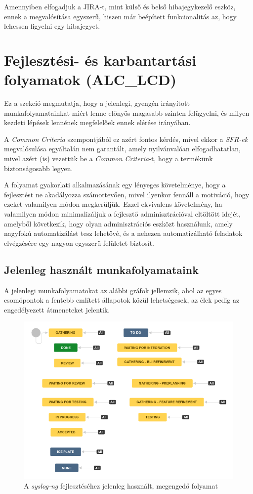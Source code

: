 Amennyiben elfogadjuk a JIRA-t, mint külső és belső hibajegykezelő eszköz, ennek a megvalósítása
egyszerű, hiszen már beépített funkcionalitás az, hogy lehessen figyelni egy hibajegyet.




\section{Fejlesztési- és karbantartási folyamatok (ALC\_LCD)}
Ez a szekció megmutatja, hogy a jelenlegi, gyengén irányított munkafolyamatainkat miért lenne
előnyös magasabb szinten felügyelni, és milyen kezdeti lépések lennének megfelelőek ennek elérése
irányában.

A \emph{Common Criteria} szempontjából ez azért fontos kérdés, mivel ekkor a \emph{SFR-ek}
megvalósulása egyáltalán nem garantált, amely nyilvánvalóan elfogadhatatlan, mivel azért (is)
vezettük be a \emph{Common Criteria}-t, hogy a termékünk biztonságosabb legyen.

A folyamat gyakorlati alkalmazásának egy lényeges követelménye, hogy a fejlesztést ne akadályozza
számottevően, mivel ilyenkor fennáll a motiváció, hogy ezeket valamilyen módon megkerüljük. Ezzel
ekvivalens követelmény, ha valamilyen módon minimalizáljuk a fejlesztő adminisztrációval eltöltött
idejét, amelyből következik, hogy olyan adminisztrációs eszközt használunk, amely nagyfokú
automatizálást tesz lehetővé, és a nehezen automatizálható feladatok elvégzésére egy nagyon egyszerű
felületet biztosít.

\subsection{Jelenleg használt munkafolyamataink}
A jelenlegi munkafolyamatokat az alábbi gráfok jellemzik, ahol az egyes csomópontok a fentebb
említett állapotok közül lehetségesek, az élek pedig az engedélyezett átmeneteket jelentik.

\begin{figure}[h]
    \centering
    \includegraphics[width=\textwidth, height=0.4\textheight, keepaspectratio]{figures/oldfeature.png}
    \caption{A \emph{syslog-ng} fejlesztéséhez jelenleg használt, megengedő folyamat}
    \label{fig:oldfeature}
\end{figure}
\FloatBarrier
\pagebreak[3]

